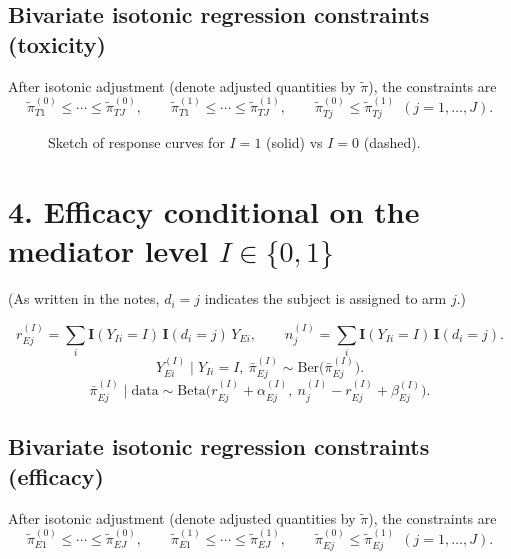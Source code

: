 \documentclass[11pt]{article}
\newcommand{\Ind}{\mathbf{I}} %
\newcommand{\Ber}{\mathrm{Ber}}
\newcommand{\BetaDist}{\mathrm{Beta}}
\begin{document}
\subsection*{Bivariate isotonic regression constraints (toxicity)}
After isotonic adjustment (denote adjusted quantities by $\tilde{\pi}$), the constraints are
\[
\tilde{\pi}_{T1}^{(0)}\le \cdots \le \tilde{\pi}_{TJ}^{(0)},\qquad
\tilde{\pi}_{T1}^{(1)}\le \cdots \le \tilde{\pi}_{TJ}^{(1)},\qquad
\tilde{\pi}_{Tj}^{(0)}\le \tilde{\pi}_{Tj}^{(1)}\ \ (j=1,\ldots,J).
\]
\begin{figure}[h]
\centering
{}
\caption{Sketch of response curves for $I=1$ (solid) vs $I=0$ (dashed).}
\end{figure}


\section*{4. Efficacy conditional on the mediator level $I\in\{0,1\}$}

\noindent (As written in the notes, $d_i=j$ indicates the subject is assigned to arm $j$.)

\[
r_{Ej}^{(I)}
= \sum_i \Ind(Y_{Ii}=I)\,\Ind(d_i=j)\,Y_{Ei},
\qquad
n_j^{(I)}=\sum_i \Ind(Y_{Ii}=I)\,\Ind(d_i=j).
\]
\[
Y_{Ei}^{(I)} \mid Y_{Ii}=I,\ \bar{\pi}_{Ej}^{(I)}
\sim \Ber\!\big(\bar{\pi}_{Ej}^{(I)}\big).
\]
\[
\bar{\pi}_{Ej}^{(I)} \mid \text{data} \sim
\BetaDist\!\Big(
  r_{Ej}^{(I)}+\alpha_{Ej}^{(I)},
  \ n_j^{(I)}-r_{Ej}^{(I)}+\beta_{Ej}^{(I)}
\Big).
\]

\subsection*{Bivariate isotonic regression constraints (efficacy)}
After isotonic adjustment (denote adjusted quantities by $\tilde{\pi}$), the constraints are
\[
\tilde{\pi}_{E1}^{(0)}\le \cdots \le \tilde{\pi}_{EJ}^{(0)},\qquad
\tilde{\pi}_{E1}^{(1)}\le \cdots \le \tilde{\pi}_{EJ}^{(1)},\qquad
\tilde{\pi}_{Ej}^{(0)}\le \tilde{\pi}_{Ej}^{(1)}\ \ (j=1,\ldots,J).
\]
\end{document}
